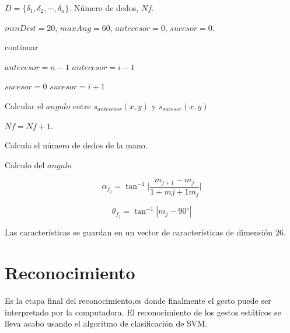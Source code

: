 \begin{algorithm}
\begin{algorithmic}[1]

\REQUIRE $D=\lbrace \delta_1, \delta_2, \cdots, \delta_n \rbrace$.  
\ENSURE Número de dedos, $Nf$.  

	\STATE $minDist=20$, $maxAng=60$, $antecesor=0$, $sucesor=0$. 	
	
	\STATE continuar
	\ENDIF 
	
	\STATE $antecesor=n-1$
	\ELSE
	\STATE $antecesor=i-1$
	\ENDIF 

	\STATE $sucesor=0$
	\ELSE
	\STATE $sucesor=i+1$
	\ENDIF   
	
	\STATE Calcular el $angulo$ entre $s_{antecesor}(x,y)$ y $s_{sucesor}(x,y)$
	
	\RETURN \FALSE
	\ENDIF  
	
	\STATE $Nf=Nf+1$.

\ENDFOR 
\caption{Calcula el número de dedos de la mano.}
\label{alg:NumDedos}
\end{algorithmic}
\end{algorithm}

Calculo del $angulo$

$$ \alpha_{f_j} = \tan^{-1}{ \bigg| \frac{m_{j+1}-m_j}{1+m{j+1}m_j} \bigg|}$$

$$ \theta_{f_j} = \tan^{-1} | {m_j} - 90^\circ |$$

Las características se guardan en un vector de características de dimensión $26$.

\section{Reconocimiento}\label{sec:ReconocimientoSystem}

Es la etapa final del reconocimiento,es donde finalmente el gesto puede ser interpretado por la computadora.   
El reconocimiento de los gestos estáticos se lleva acabo usando el algoritmo de clasificación de SVM. 




%

